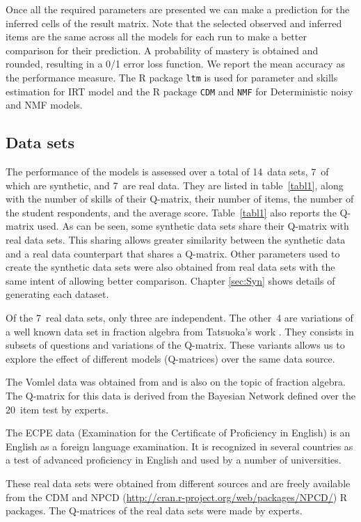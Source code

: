 Once all the required parameters are presented we can make a prediction for the inferred cells of the result matrix. Note that the selected observed and inferred items are the same across all the models for each run to make a better comparison for their prediction. A probability of mastery is obtained and rounded, resulting in a 0/1 error loss function.  We report the mean accuracy as the performance measure.  The R package \texttt{ltm} is used for parameter and skills estimation for IRT model and the R package \texttt{CDM} and \texttt{NMF} for Deterministic noisy and NMF models. 


\subsection{Data sets}

The performance of the models is assessed over a total of 14~data sets, 7~of which are synthetic, and 7~are real data.  They are listed in table~\ref{tabl1}, along with the number of skills of their Q-matrix, their number of items, the number of the student respondents, and the average score.  Table~\ref{tabl1} also reports the Q-matrix used.  As can be seen, some synthetic data sets share their Q-matrix with real data sets.  This sharing allows greater similarity between the synthetic data and a real data counterpart that shares a Q-matrix.  Other parameters used to create the synthetic data sets were also obtained from real data sets with the same intent of allowing better comparison. Chapter \ref{sec:Syn} shows details of generating each dataset.

Of the 7~real data sets, only three are independent.  The other~4 are variations of a well known data set in fraction algebra from Tatsuoka's work \citep{tatsuoka1984analysis}.  They consists in subsets of questions and variations of the Q-matrix.  These variants allows us to explore the effect of different models (Q-matrices) over the same data source.

The Vomlel data was obtained from \citep{vomlel:2004} and is also on the topic of fraction algebra.  The Q-matrix for this data is derived from the Bayesian Network defined over the 20~item test by experts.

The ECPE data (Examination for the Certificate of Proficiency in English) is an English as a foreign language examination. It is recognized in several countries as a test of advanced proficiency in English and used by a number of universities.

These real data sets were obtained from different sources and are freely available from the CDM \citep{Robitzsch2012} and NPCD ({\url{http://cran.r-project.org/web/packages/NPCD/}}) R packages. The Q-matrices of the real data sets were made by experts.


